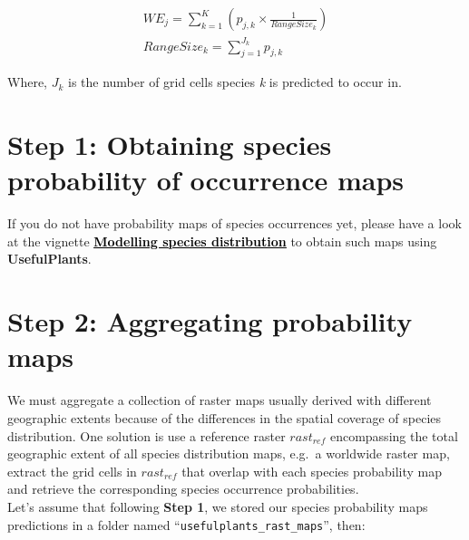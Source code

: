 \documentclass[
]{article}
\begin{document}
\begin{gather}
\tag{3}
WE_j = \sum_{k=1}^K(p_{j,k}\times\frac{1}{Range Size_k})
\\
\tag{4}
RangeSize_k = \sum_{j=1}^{J_k}p_{j,k}
\end{gather}

Where, \(J_k\) is the number of grid cells species \emph{k} is predicted
to occur in.

\hypertarget{step-1-obtaining-species-probability-of-occurrence-maps}{%
\section{Step 1: Obtaining species probability of occurrence
maps}\label{step-1-obtaining-species-probability-of-occurrence-maps}}

If you do not have probability maps of species occurrences yet, please
have a look at the vignette
\href{}{\textbf{\textcolor{black}{\underline{Modelling species distribution}}}}
to obtain such maps using \textbf{UsefulPlants}.

\hypertarget{step-2-aggregating-probability-maps}{%
\section{Step 2: Aggregating probability
maps}\label{step-2-aggregating-probability-maps}}

We must aggregate a collection of raster maps usually derived with
different geographic extents because of the differences in the spatial
coverage of species distribution. One solution is use a reference raster
\(rast_{ref}\) encompassing the total geographic extent of all species
distribution maps, e.g.~a worldwide raster map, extract the grid cells
in \(rast_{ref}\) that overlap with each species probability map and
retrieve the corresponding species occurrence probabilities.\\
Let's assume that following \textbf{Step 1}, we stored our species
probability maps predictions in a folder named
``\texttt{usefulplants\_rast\_maps}'', then:
\end{document}
